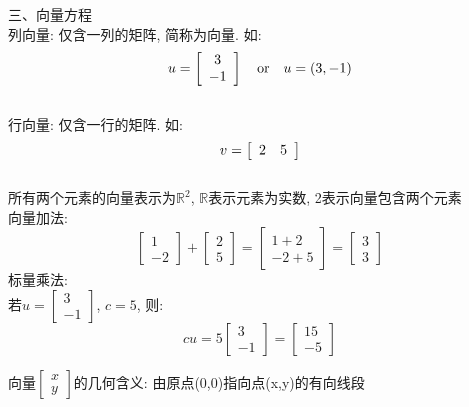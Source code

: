 \documentclass[UTF8,fontset=ubuntu]{ctexart}
\theoremstyle{nonumberplain}
\theoremstyle{break}
\theoremstyle{empty}
\begin{document}
三、向量方程\\[1ex]
列向量: 仅含一列的矩阵, 简称为向量. 如:
\[u=\left[\begin{array}{c}
	3\\
	-1
\end{array}\right] \text{\quad or\quad} u=(3, -1)\]\\[2ex]
行向量: 仅含一行的矩阵. 如:
\[v=\left[\begin{array}{c c}
	2 & 5
\end{array}\right]\]\\[2ex]
所有两个元素的向量表示为$\mathbb{R}^2$, $\mathbb{R}$表示元素为实数, 2表示向量包含两个元素\\
向量加法:
\begin{equation*}
\left[\begin{array}{c}
	1\\
	-2
\end{array}\right]
+
\left[\begin{array}{c}
	2\\
	5
\end{array}\right]
=
\left[\begin{array}{c}
	1+2\\
	-2+5
\end{array}\right]
=
\left[\begin{array}{c}
	3\\
	3
\end{array}\right]
\end{equation*}
标量乘法:\\
\indent 若$u=\left[\begin{array}{c}3\\-1\end{array}\right]$, $c=5$, 则:
\[cu=5\left[\begin{array}{c}3\\-1\end{array}\right]=\left[\begin{array}{c}15\\-5\end{array}\right]\]

向量$\left[\begin{array}{r}x\\y\end{array}\right]$的几何含义: 由原点(0,0)指向点(x,y)的有向线段\\[2ex]
\end{document}
